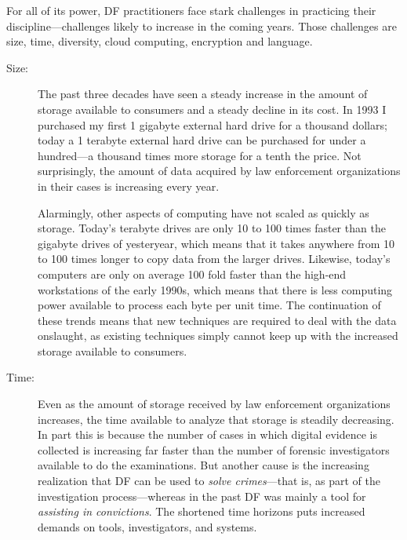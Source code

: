 For all of its power, DF practitioners face stark
challenges in practicing their discipline---challenges likely to
increase in the coming years. Those challenges are size,
time, diversity, cloud computing, encryption and language.

\begin{description}

\item[Size:] The past three decades have seen a steady increase in the
  amount of storage available to consumers and a steady decline in its
  cost. In 1993 I purchased my first 1 gigabyte external hard drive
  for a thousand dollars; today a 1 terabyte external hard drive can
  be purchased for under a hundred---a thousand times more
  storage for a tenth the price. Not surprisingly, the amount of data
  acquired by law enforcement organizations in their cases is
  increasing every year.

  Alarmingly, other aspects of computing have not scaled as quickly as
  storage. Today's terabyte drives are only 10 to 100 times faster
  than the gigabyte drives of yesteryear, which means that it takes anywhere
  from 10 to 100 times longer to copy  data from the larger
  drives. Likewise, today's computers are only on average 100 fold
  faster than the high-end workstations of the early 1990s, which
  means that there is less computing power available to process each
  byte per unit time. The continuation of these trends means that new techniques are
  required to deal with the data onslaught, as existing techniques
  simply cannot keep up with the increased storage available to consumers.


\item[Time:] Even as the amount of storage received by law enforcement
  organizations increases, the time available to analyze that storage
  is steadily decreasing. In part this is because the number of cases
  in which digital evidence is collected is increasing far faster than
  the number of forensic investigators available to do the
  examinations. But another cause is the increasing realization that
  DF can be used to \emph{solve crimes}---that is, as
  part of the investigation process---whereas in the
  past DF was mainly a tool for \emph{assisting in convictions}. The
  shortened time horizons puts increased demands on tools,
  investigators, and systems.


\end{description}
